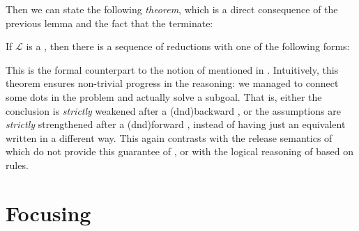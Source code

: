 \begin{scope}
Then we can state the following \emph{ theorem}, which is a direct
consequence of the previous lemma and the fact that the 
terminate:

\begin{theorem}[Productivity]
If $\mathcal{L}$ is a  , then there
is a sequence of reductions with one of the following forms:
\end{theorem}

This is the formal counterpart to the notion of  mentioned in
. Intuitively, this theorem ensures non-trivial progress in the
reasoning: we managed to connect some dots in the problem and actually solve a
subgoal. That is, either the conclusion is \emph{strictly} weakened after a
\kl(dnd){backward} , or the assumptions are \emph{strictly} strengthened
after a \kl(dnd){forward} , instead of having just an equivalent
 written in a different way. This again contrasts with the release semantics of
 which do not provide this guarantee of , or
with the logical reasoning  of  based on
 rules.

\section{Focusing}



\end{scope}
